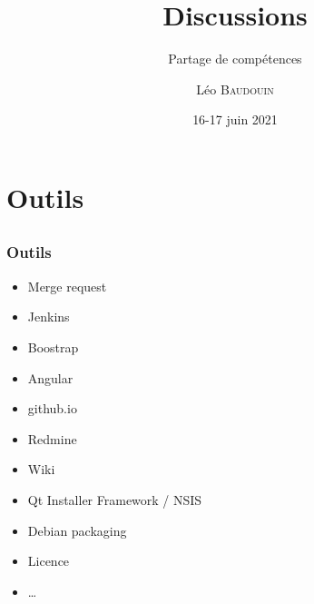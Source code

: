 \documentclass{beamer}
\title{Discussions}
\subtitle{Partage de compétences}
\author{L\'eo \textsc{Baudouin}}
\institute{
  {\url{baudouin.leo @ gmail.com}}
}
\date{16-17 juin 2021}
\begin{document}
\begin{frame}
  \titlepage
\end{frame}




\section{Outils}
\subsection{}

\begin{frame}
  \frametitle{Outils}
  \begin{block}{}
  \begin{itemize}[<+->]
  \item Merge request
  \item Jenkins
  \item Boostrap
  \item Angular
  \item github.io
  \item Redmine
  \item Wiki
  \item Qt Installer Framework / NSIS
  \item Debian packaging
  \item Licence
  \item \dots
  \end{itemize}
  \end{block}  
\end{frame}

\end{document}
